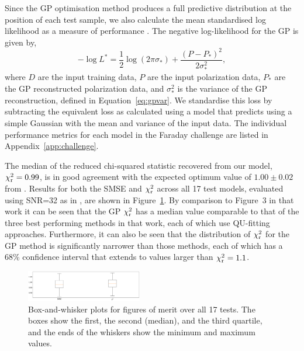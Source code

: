 \documentclass[fleqn,usenatbib]{mnras}
\begin{document}
Since the GP optimisation method produces a full predictive distribution at the position of each test sample, we also calculate the mean standardised log likelihood as a measure of performance \citep{3569}. The negative log-likelihood for the GP is given by,
%
\begin{equation}
\label{eq:logl}
-\log L^{\ast} = \frac{1}{2}\log(2\pi \sigma_{\ast}) + \frac{(P - P_{\ast})^2}{2\sigma_{\ast}^2},
\end{equation}
%
where $D$ are the input training data, $P$ are the input polarization data, $P_{\ast}$ are the GP reconstructed polarization data, and $\sigma_{\ast}^2$ is the variance of the GP reconstruction, defined in Equation~\ref{eq:gpvar}.
We standardise this loss by subtracting the equivalent loss as calculated using a model that predicts using a simple Gaussian with the mean and variance of the input data. The individual performance metrics for each model in the Faraday challenge are listed in Appendix~\ref{app:challenge}.

The median of the reduced chi-squared statistic recovered from our model, $\chi^2_{\rm r} = 0.99$, is in good agreement with the expected optimum value of $1.00\pm0.02$ from \cite{Sun_2015}. Results for both the SMSE and $\chi_{\rm r}^2$ across all 17 test models, evaluated using SNR=32 as in \cite{Sun_2015}, are shown in Figure~\ref{fig:sunmetrics}. By comparison to Figure~3 in that work it can be seen that the GP $\chi_{\rm r}^2$ has a median value comparable to that of the three best performing methods in that work, each of which use QU-fitting approaches. Furthermore, it can also be seen that the distribution of $\chi_{\rm r}^2$ for the GP method is significantly narrower than those methods, each of which has a 68\% confidence interval that extends to values larger than $\chi_{\rm r}^2=1.1$.
%
\begin{figure}
    \centering
    \includegraphics[width=0.45\textwidth]{./FIGURES/smse.png}
    \caption{Box-and-whisker plots for figures of merit over all 17 tests. The boxes show the first, the second (median), and the third quartile, and the ends of the whiskers show the minimum and maximum values.}
    \label{fig:sunmetrics}
\end{figure}

%
%
\end{document}
